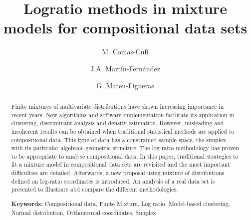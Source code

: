 \documentclass[12pt, a4paper]{article}
\title{Logratio methods in mixture models for compositional data sets}
\author{M. Comas-Cufí \and J.A. Martín-Fernández \and G. Mateu-Figueras}
\begin{document}
\maketitle




\begin{abstract}
Finite mixtures of multivariate distributions have shown increasing importance in recent years. New algorithms and software implementation facilitate its application in clustering, discriminant analysis and density estimation. 
However, misleading and incoherent results can be obtained when traditional statistical methods are applied to compositional data. This type of data has a constrained sample space, the simplex, with its particular algebraic-geometric structure. The log-ratio methodology has proven to be appropriate to analyse compositional data. In this paper, traditional strategies to fit a mixture model in compositional data sets are revisited and the most important difficulties are detailed. Afterwards, a new proposal using mixture of distributions defined on log-ratio coordinates is introduced. An analysis of a real data set is presented to illustrate abd compare the different methodologies.

{\bf Keywords:} Compositional data, Finite Mixture, Log ratio, Model-based clustering, Normal distribution, Orthonormal coordinates, Simplex
\end{abstract}



\end{document}
